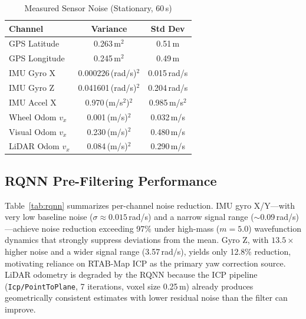 \documentclass[conference]{IEEEtran}
\begin{document}
\begin{table}[t]
\centering
\caption{Measured Sensor Noise (Stationary, 60\,s)}
\label{tab:noise}
\begin{tabular}{@{}lcc@{}}
\toprule
\textbf{Channel} & \textbf{Variance} & \textbf{Std Dev} \\
\midrule
GPS Latitude        & 0.263\,m$^2$          & 0.51\,m \\
GPS Longitude       & 0.245\,m$^2$          & 0.49\,m \\
IMU Gyro X          & 0.000226\,(rad/s)$^2$ & 0.015\,rad/s \\
IMU Gyro Z          & 0.041601\,(rad/s)$^2$ & 0.204\,rad/s \\
IMU Accel X         & 0.970\,(m/s$^2$)$^2$  & 0.985\,m/s$^2$ \\
Wheel Odom $v_x$    & 0.001\,(m/s)$^2$      & 0.032\,m/s \\
Visual Odom $v_x$   & 0.230\,(m/s)$^2$      & 0.480\,m/s \\
LiDAR Odom $v_x$    & 0.084\,(m/s)$^2$      & 0.290\,m/s \\
\bottomrule
\end{tabular}
\end{table}

\subsection{RQNN Pre-Filtering Performance}

Table~\ref{tab:rqnn} summarizes per-channel noise reduction. IMU gyro X/Y---with
very low baseline noise ($\sigma \approx 0.015$\,rad/s) and a narrow signal range
($\sim$0.09\,rad/s)---achieve noise reduction exceeding 97\% under high-mass
($m = 5.0$) wavefunction dynamics that strongly suppress deviations from the mean.
Gyro Z, with $13.5\times$ higher noise and a wider signal range (3.57\,rad/s),
yields only 12.8\% reduction, motivating reliance on RTAB-Map ICP as the primary
yaw correction source. LiDAR odometry is degraded by the RQNN because the ICP
pipeline (\texttt{Icp/PointToPlane}, 7 iterations, voxel size 0.25\,m) already
produces geometrically consistent estimates with lower residual noise than the
filter can improve.
\end{document}
